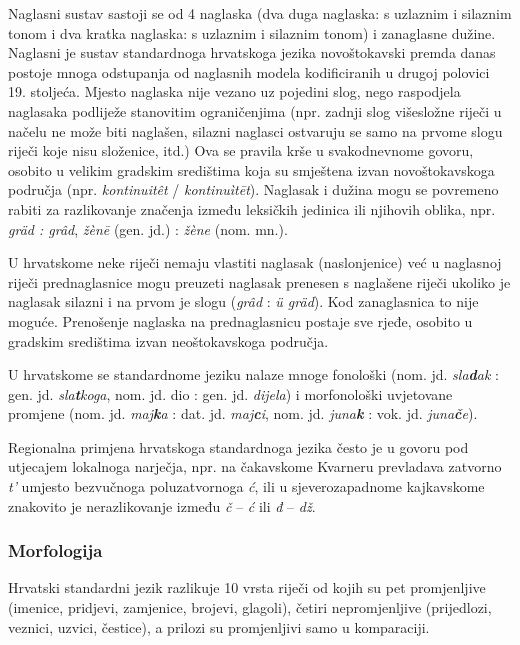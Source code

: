 \begin{multicols}{2}
Naglasni sustav sastoji se od 4 naglaska (dva duga naglaska: s uzlaznim i silaznim tonom i dva kratka naglaska: s uzlaznim i silaznim tonom) i zanaglasne dužine. Naglasni je sustav standardnoga hrvatskoga jezika novoštokavski premda danas postoje mnoga odstupanja od naglasnih modela kodificiranih u drugoj polovici 19. stoljeća. Mjesto naglaska nije vezano uz pojedini slog, nego raspodjela naglasaka podliježe stanovitim ograničenjima (npr. zadnji slog višesložne riječi u načelu ne može biti naglašen, silazni naglasci ostvaruju se samo na prvome slogu riječi koje nisu složenice, itd.) Ova se pravila krše u svakodnevnome govoru, osobito u velikim gradskim središtima koja su smještena izvan novoštokavskoga područja (npr. \emph{kontinuitêt} / \emph{kontinuìtēt}). Naglasak i dužina mogu se povremeno rabiti za razlikovanje značenja između leksičkih jedinica ili njihovih oblika, npr. \emph{gräd : grâd}, \emph{žènē} (gen. jd.) : \emph{žène} (nom. mn.).

U hrvatskome neke riječi nemaju vlastiti naglasak (naslonjenice) već u naglasnoj riječi prednaglasnice mogu preuzeti naglasak prenesen s naglašene riječi ukoliko je naglasak silazni i na prvom je slogu (\emph{grâd} : \emph{ü gräd}). Kod zanaglasnica to nije moguće. Prenošenje naglaska na prednaglasnicu postaje sve rjeđe, osobito u gradskim središtima izvan neoštokavskoga područja.

U hrvatskome se standardnome jeziku nalaze mnoge fonološki (nom. jd. \emph{sla\textbf{d}ak} : gen. jd. \emph{sla\textbf{t}koga}, nom. jd. dio : gen. jd. \emph{dijela}) i morfonološki uvjetovane promjene (nom. jd. \emph{maj\textbf{k}a} : dat. jd. \emph{maj\textbf{c}i}, nom. jd. \emph{juna\textbf{k}} : vok. jd. \emph{juna\textbf{č}e}).

Regionalna primjena hrvatskoga standardnoga jezika često je u govoru pod utjecajem lokalnoga narječja, npr. na čakavskome Kvarneru prevladava zatvorno \emph{t'} umjesto bezvučnoga poluzatvornoga \emph{ć}, ili u sjeverozapadnome kajkavskome znakovito je nerazlikovanje između \emph{č} – \emph{ć} ili \emph{đ} – \emph{dž}.

\subsubsection{Morfologija}

Hrvatski standardni jezik razlikuje 10 vrsta riječi od kojih su pet promjenljive (imenice, pridjevi, zamjenice, brojevi, glagoli), četiri nepromjenljive (prijedlozi, veznici, uzvici, čestice), a prilozi su promjenljivi samo u komparaciji.


\end{multicols}
